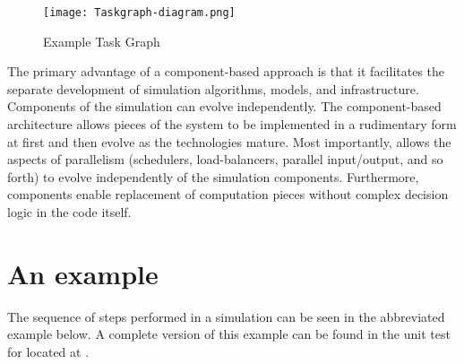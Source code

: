\begin{figure}
  \centering
  \texttt{[image: Taskgraph-diagram.png]}
  \caption{Example Task Graph}
  \label{fig:TaskGraph}
\end{figure}

The primary advantage of a component-based approach is that it
facilitates the separate development of simulation algorithms, models,
and infrastructure. Components of the simulation can evolve
independently. The component-based architecture allows pieces of the
system to be implemented in a rudimentary form at first and then
evolve as the technologies mature. Most importantly, \Vaango allows the
aspects of parallelism (schedulers, load-balancers, parallel
input/output, and so forth) to evolve independently of the simulation
components. Furthermore, components enable replacement of computation
pieces without complex decision logic in the code itself.

\section{An example}
The sequence of steps performed in a simulation can be seen in the
abbreviated example below.  A complete version of this example can be 
found in the unit test for   located
at .

